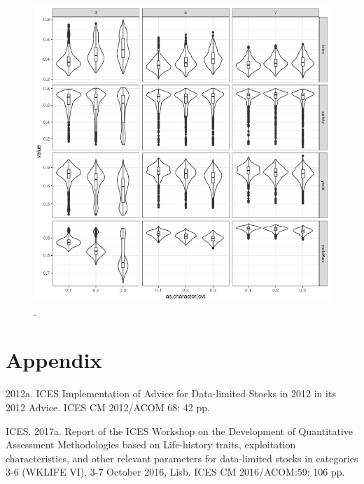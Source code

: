 \documentclass[12pt,doublespacing,a4paper]{ouparticle}
\begin{document}
\newpage
\begin{figure}[h]
\centering
\includegraphics[width=\textwidth]{figs-unnamed-chunk-1-1.png}
\caption{.}
\label{fig:mse}
\end{figure}


\clearpage
\section{Appendix}


2012a. ICES Implementation of Advice for Data-limited Stocks in 2012 in its 2012 Advice. ICES CM 2012/ACOM 68: 42 pp.

ICES. 2017a. Report of the ICES Workshop on the Development of Quantitative Assessment Methodologies based on Life-history traits, exploitation characteristics, and other relevant parameters for data-limited stocks in categories 3-6 (WKLIFE VI), 3-7 October 2016, Lisb. ICES CM 2016/ACOM:59: 106 pp.
\end{document}

